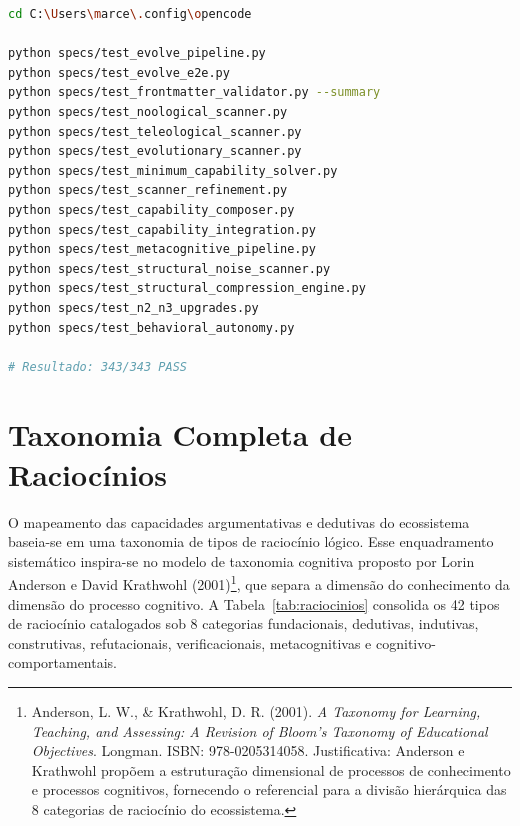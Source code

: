 \documentclass[12pt,a4paper,oneside]{abntex2}
\begin{document}
\begin{apendicesenv}
\begin{lstlisting}[language=bash, caption={Script de verificacao completa (343 CTs)}]
cd C:\Users\marce\.config\opencode

python specs/test_evolve_pipeline.py
python specs/test_evolve_e2e.py
python specs/test_frontmatter_validator.py --summary
python specs/test_noological_scanner.py
python specs/test_teleological_scanner.py
python specs/test_evolutionary_scanner.py
python specs/test_minimum_capability_solver.py
python specs/test_scanner_refinement.py
python specs/test_capability_composer.py
python specs/test_capability_integration.py
python specs/test_metacognitive_pipeline.py
python specs/test_structural_noise_scanner.py
python specs/test_structural_compression_engine.py
python specs/test_n2_n3_upgrades.py
python specs/test_behavioral_autonomy.py

# Resultado: 343/343 PASS
\end{lstlisting}

\chapter{Taxonomia Completa de Raciocínios}

O mapeamento das capacidades argumentativas e dedutivas do ecossistema baseia-se em uma taxonomia de tipos de raciocínio lógico. Esse enquadramento sistemático inspira-se no modelo de taxonomia cognitiva proposto por Lorin Anderson e David Krathwohl (2001)\footnote{Anderson, L. W., \& Krathwohl, D. R. (2001). \textit{A Taxonomy for Learning, Teaching, and Assessing: A Revision of Bloom's Taxonomy of Educational Objectives}. Longman. ISBN: 978-0205314058. Justificativa: Anderson e Krathwohl propõem a estruturação dimensional de processos de conhecimento e processos cognitivos, fornecendo o referencial para a divisão hierárquica das 8 categorias de raciocínio do ecossistema.}, que separa a dimensão do conhecimento da dimensão do processo cognitivo. A Tabela~\ref{tab:raciocinios} consolida os 42 tipos de raciocínio catalogados sob 8 categorias fundacionais, dedutivas, indutivas, construtivas, refutacionais, verificacionais, metacognitivas e cognitivo-comportamentais.


\end{apendicesenv}
\end{document}
